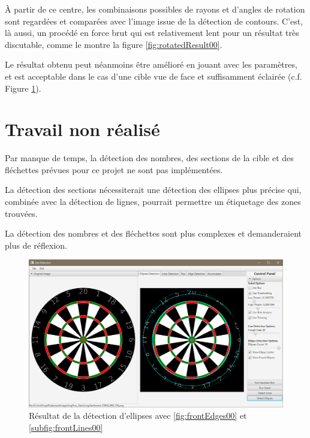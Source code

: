 \documentclass[a4paper, 11pt]{article}
\begin{document}
\begin{multicols}{2}

\par
\`A partir de ce centre, les combinaisons possibles de rayons et d'angles de rotation sont regardées et comparées avec l'image issue de la détection de contours. C'est, là aussi, un procédé en \og force brut \fg{} qui est relativement lent pour un résultat très discutable, comme le montre la figure \ref{fig:rotatedResult00}.
\par
Le résultat obtenu peut néanmoins être amélioré en jouant avec les paramètres, et est acceptable dans le cas d'une cible vue de face et suffisamment éclairée (c.f. Figure \ref{fig:frontResult00}).

\section{Travail non réalisé}
\par
Par manque de temps, la détection des nombres, des sections de la cible et des fléchettes prévues pour ce projet ne sont pas implémentées.
\par
La détection des sections nécessiterait une détection des ellipses plus précise qui, combinée avec la détection de lignes, pourrait permettre un étiquetage des zones trouvées.
\par
La détection des nombres et des fléchettes sont plus complexes et demanderaient plus de réflexion.

\end{multicols}

\begin{figure}[!h]
\centering
\includegraphics[width=0.85\linewidth]{img/front_result_00.png}
\vspace{-2mm}
\caption{Résultat de la détection d'ellipses avec \ref{fig:frontEdges00} et \ref{subfig:frontLines00}}
\label{fig:frontResult00}
\end{figure}
\end{document}
